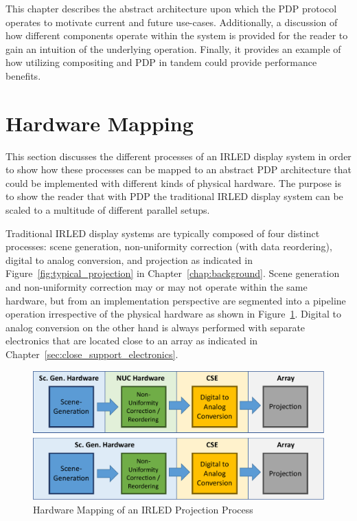 \label{chap:machine_model}


This chapter describes the abstract architecture upon which the PDP protocol operates to motivate current and future use-cases. Additionally, a discussion of how different components operate within the system is provided for the reader to gain an intuition of the underlying operation. Finally, it provides an example of how utilizing compositing and PDP in tandem could provide performance benefits.

\section{Hardware Mapping}
    This section discusses the different processes of an IRLED display system in order to show how these processes can be mapped to an abstract PDP architecture that could be implemented with different kinds of physical hardware. The purpose is to show the reader that with PDP the traditional IRLED display system can be scaled to a multitude of different parallel setups.

    Traditional IRLED display systems are typically composed of four distinct processes: scene generation, non-uniformity correction (with data reordering), digital to analog conversion, and projection as indicated in Figure~\ref{fig:typical_projection} in Chapter~\ref{chap:background}. Scene generation and non-uniformity correction may or may not operate within the same hardware, but from an implementation perspective are segmented into a pipeline operation irrespective of the physical hardware as shown in Figure~\ref{fig:typical_projection_hardware}. Digital to analog conversion on the other hand is always performed with separate electronics that are located close to an array as indicated in Chapter~\ref{sec:close_support_electronics}.

    \begin{figure}
        \centering
        \includegraphics[width=1.0\textwidth]{fig/typical_projection_system_hardware.pdf}
        \caption{Hardware Mapping of an IRLED Projection Process}
        \label{fig:typical_projection_hardware}
    \end{figure}

